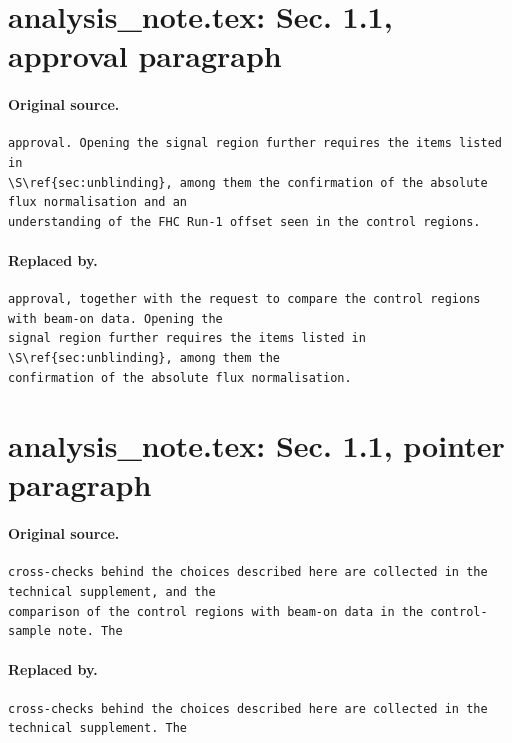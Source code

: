 \documentclass[11pt,a4paper]{article}
\begin{document}
\section{analysis\_note.tex: Sec. 1.1, approval paragraph}
\paragraph{Original source.}
\begin{lstlisting}[language={[LaTeX]TeX},basicstyle=\ttfamily\footnotesize,columns=fullflexible]
approval. Opening the signal region further requires the items listed in
\S\ref{sec:unblinding}, among them the confirmation of the absolute flux normalisation and an
understanding of the FHC Run-1 offset seen in the control regions.
\end{lstlisting}
\paragraph{Replaced by.}
\begin{lstlisting}[language={[LaTeX]TeX},basicstyle=\ttfamily\footnotesize,columns=fullflexible]
approval, together with the request to compare the control regions with beam-on data. Opening the
signal region further requires the items listed in \S\ref{sec:unblinding}, among them the
confirmation of the absolute flux normalisation.
\end{lstlisting}

\section{analysis\_note.tex: Sec. 1.1, pointer paragraph}
\paragraph{Original source.}
\begin{lstlisting}[language={[LaTeX]TeX},basicstyle=\ttfamily\footnotesize,columns=fullflexible]
cross-checks behind the choices described here are collected in the technical supplement, and the
comparison of the control regions with beam-on data in the control-sample note. The
\end{lstlisting}
\paragraph{Replaced by.}
\begin{lstlisting}[language={[LaTeX]TeX},basicstyle=\ttfamily\footnotesize,columns=fullflexible]
cross-checks behind the choices described here are collected in the technical supplement. The
\end{lstlisting}
\end{document}
